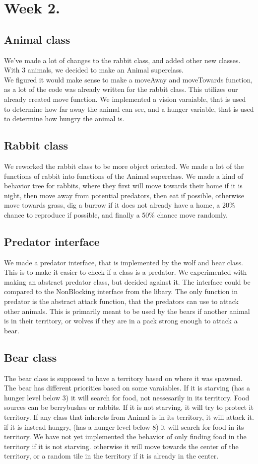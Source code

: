 \documentclass[11pt]{article}
\begin{document}
    \section*{Week 2.}
    \subsection*{Animal class}
    We've made a lot of changes to the rabbit class, and added other new classes. With 3 animals, we decided to make an Animal superclass.
    \\
    We figured it would make sense to make a moveAway and moveTowards function, as a lot of the code was already written for the rabbit class. 
    This utilizes our already created move function. We implemented a vision varaiable, that is used to determine how far away the animal can see, and a 
    hunger variable, that is used to determine how hungry the animal is.
    \subsection*{Rabbit class}
    We reworked the rabbit class to be more object oriented. We made a lot of the functions of rabbit into functions of the Animal superclass. 
    We made a kind of behavior tree for rabbits, where they first will move towards their home if it is night, then move away from potential predators,
    then eat if possible, otherwise move towards grass, dig a burrow if it does not already have a home, a 20\% chance to reproduce if possible, 
    and finally a 50\% chance move randomly.
    \subsection*{Predator interface}
    We made a predator interface, that is implemented by the wolf and bear class. This is to make it easier to check if a class is a predator. 
    We experimented with making an abstract predator class, but decided against it. The interface could be compared to the NonBlocking interface from the libary. 
    The only function in predator is the abstract attack function, that the predators can use to attack other animals. This is primarily meant to be used by 
    the bears if another animal is in their territory, or wolves if they are in a pack strong enough to attack a bear.
    \subsection*{Bear class}
    The bear class is supposed to have a territory based on where it was spawned. The bear has different priorities based on some varaiables. 
    If it is starving (has a hunger level below 3) it will search for food, not nessesarily in its territory. Food sources can be berrybushes or rabbits. 
    If it is not starving, it will try to protect it territory. If any class that inherets from Animal is in its territory, it will attack it. 
    if it is instead hungry, (has a hunger level below 8) it will search for food in its territory. We have not yet implemented the behavior of only 
    finding food in the territory if it is not starving. otherwise it will move towards the center of the territory, or a random tile in the territory if 
    it is already in the center.
\end{document}
